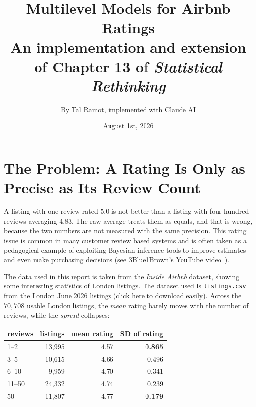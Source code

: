 \documentclass[11pt,a4paper]{article}
\title{\textbf{Multilevel Models for Airbnb Ratings}\\[2pt]
       \large An implementation and extension of Chapter 13 of
       \emph{Statistical Rethinking}}
\author{By Tal Ramot, implemented with Claude AI \textcopyright}
\date{August 1st, 2026}
\begin{document}
\maketitle
\vspace{-2.5em}

\section{The Problem: A Rating Is Only as Precise as Its Review Count}

A listing with one review rated $5.0$ is not better than a listing with four
hundred reviews averaging $4.83$. The raw average treats them as equals, and
that is wrong, because the two numbers are not measured with the same
precision. This rating issue is common in many customer review based systems and is often taken as a pedagogical example of exploiting Bayesian inference tools to improve estimates and even make purchasing decisions (see \href{https://www.youtube.com/watch?v=8idr1WZ1A7Q\&list=PL4cNQ1YkG5WhQGmPnRe4vDUImh_nviriy\&index=3}{3Blue1Brown's YouTube video}~\cite{3blue1brown_youtube_rating}).

The data used in this report is taken from the \emph{Inside Airbnb} dataset\cite{inside_airbnb}, showing some interesting statistics of London listings. The dataset used is \texttt{listings.csv} from the London June 2026 listings (click \href{https://data.insideairbnb.com/united-states/nc/asheville/2026-06-25/visualisations/listings.csv}{here} to download easily).
Across the $70{,}708$ usable
London listings, the \emph{mean} rating barely moves with the number of
reviews, while the \emph{spread} collapses:

\begin{center}
\begin{tabular}{lrrr}
\toprule
reviews & listings & mean rating & SD of rating \\
\midrule
1--2   & 13{,}995 & 4.57 & \textbf{0.865} \\
3--5   & 10{,}615 & 4.66 & 0.496 \\
6--10  &  9{,}959 & 4.70 & 0.341 \\
11--50 & 24{,}332 & 4.74 & 0.239 \\
50+    & 11{,}807 & 4.77 & \textbf{0.179} \\
\bottomrule
\end{tabular}
\end{center}
\end{document}
